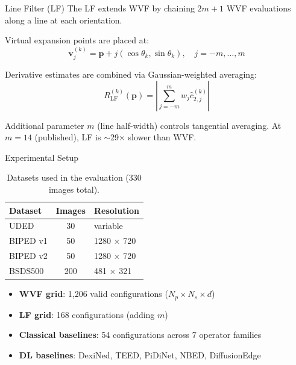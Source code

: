 \documentclass[10pt, aspectratio=169]{beamer}
\begin{document}
\begin{frame}{Line Filter (LF)}
  The LF extends WVF by chaining $2m + 1$ WVF evaluations along a line at each orientation.

  \vspace{0.3em}
  Virtual expansion points are placed at:
  \[
    \mathbf{v}_j^{(k)} = \mathbf{p} + j(\cos\theta_k, \sin\theta_k), \quad j = -m, \ldots, m
  \]

  Derivative estimates are combined via Gaussian-weighted averaging:
  \[
    R_{\text{LF}}^{(k)}(\mathbf{p}) = \left| \sum_{j=-m}^{m} w_j \hat{c}_{2,j}^{(k)} \right|
  \]

  \vspace{0.3em}
  Additional parameter $m$ (line half-width) controls tangential averaging.
  At $m = 14$ (published), LF is $\sim$29$\times$ slower than WVF.
\end{frame}

\begin{frame}{Experimental Setup}
  \begin{table}
    \centering
    \caption{Datasets used in the evaluation (330 images total).}
    \begin{tabular}{lcl}
      \toprule
      \textbf{Dataset} & \textbf{Images} & \textbf{Resolution} \\
      \midrule
      UDED       & 30  & variable \\
      BIPED v1   & 50  & 1280 $\times$ 720 \\
      BIPED v2   & 50  & 1280 $\times$ 720 \\
      BSDS500    & 200 & 481 $\times$ 321 \\
      \bottomrule
    \end{tabular}
  \end{table}

  \vspace{0.3em}
  \begin{itemize}
    \item \textbf{WVF grid}: 1,206 valid configurations ($N_p \times N_s \times d$)
    \item \textbf{LF grid}: 168 configurations (adding $m$)
    \item \textbf{Classical baselines}: 54 configurations across 7 operator families
    \item \textbf{DL baselines}: DexiNed, TEED, PiDiNet, NBED, DiffusionEdge
  \end{itemize}
\end{frame}
\end{document}
